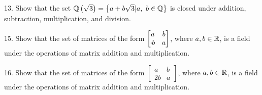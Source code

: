 \begin{mdframed}[style=darkAnswer,frametitle={Joe Starr}]
\end{mdframed}
\newpage
\begin{mdframed}[style=darkQuesion]
  13. Show that the set $\mathbb{Q}\left(\sqrt{3}\right)=\left\{a+b\sqrt{3}\vert a,\ b\in \mathbb{Q}\right\}$
  is closed under addition, subtraction, multiplication, and division. 
\end{mdframed}
\begin{mdframed}[style=darkAnswer,frametitle={Joe Starr}]
\end{mdframed}
\newpage
\begin{mdframed}[style=darkQuesion]
  15. Show that the set of matrices of the form $\begin{bmatrix}
    a&b\\\m b&a
  \end{bmatrix}$, where $a,b\in  \mathbb{R}$, is a field under the operations of matrix 
  addition and multiplication.
\end{mdframed}
\begin{mdframed}[style=darkAnswer,frametitle={Joe Starr}]
\end{mdframed}
\newpage
\begin{mdframed}[style=darkQuesion]
  16. Show that the set of matrices of the form $\begin{bmatrix}
    a&b\\2b&a
  \end{bmatrix}$, where $a,b\in  \mathbb{R}$, is a field under the operations of matrix 
  addition and multiplication.
\end{mdframed}
\begin{mdframed}[style=darkAnswer,frametitle={Joe Starr}]
\end{mdframed}
\newpage